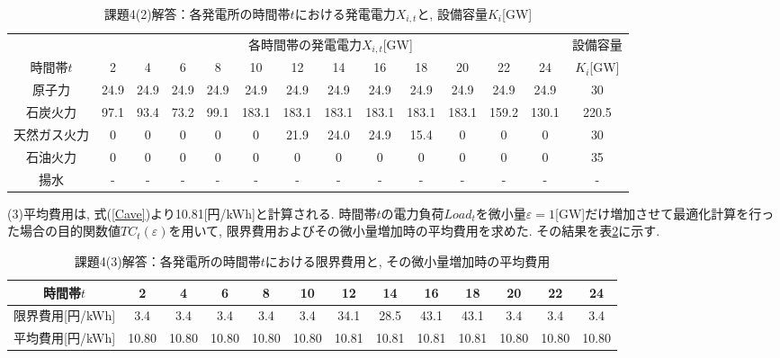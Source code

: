 \documentclass[]{jsarticle}
\begin{document}
          \begin{table}[htb]
            \begin{center}
              \caption{課題4(2)解答：各発電所の時間帯$t$における発電電力$X_{i,t}$と, 設備容量$K_i$[GW]}
              \begin{tabular}{|c||c|c|c|c|c|c|c|c|c|c|c|c||c|} \hline
                \multicolumn{1}{|c||}{} & \multicolumn{12}{|c||}{各時間帯の発電電力$X_{i,t}$[GW]} & \multicolumn{1}{|c|}{設備容量} \\ \cline{1-13}
                時間帯$t$ & 2 & 4 & 6 & 8 & 10 & 12 & 14 & 16 & 18 & 20 & 22 & 24 & $K_i$[GW]\\ \hline \hline
                原子力 &  24.9 & 24.9 & 24.9 & 24.9 & 24.9 & 24.9 & 24.9 & 24.9 & 24.9 & 24.9 & 24.9 & 24.9 & 30\\ \hline
                石炭火力 & 97.1 & 93.4 & 73.2 & 99.1 & 183.1 & 183.1 & 183.1 & 183.1 & 183.1 & 183.1 & 159.2 & 130.1 & 220.5\\ \hline
                天然ガス火力 & 0 & 0 & 0 & 0 & 0 & 21.9 & 24.0 & 24.9 & 15.4 & 0 & 0 & 0 & 30\\ \hline
                石油火力 & 0 & 0 & 0 & 0 & 0 & 0 & 0 & 0 & 0 & 0 & 0 & 0 & 35\\ \hline
                揚水 & - & - & - & - & - & - & - & - & - & - & - & - & - \\ \hline
              \end{tabular}
              \label{ans42}
            \end{center}
          \end{table}


      (3)平均費用は, 式(\ref{Cave})より10.81[円/kWh]と計算される. 時間帯$t$の電力負荷$Load_t$を微小量$\varepsilon = 1$[GW]だけ増加させて最適化計算を行った場合の目的関数値$TC_t(\varepsilon)$を用いて, 限界費用およびその微小量増加時の平均費用を求めた. その結果を表\ref{ans43}に示す.

      \begin{table}
        \begin{center}
          \caption{課題4(3)解答：各発電所の時間帯$t$における限界費用と, その微小量増加時の平均費用}
          \begin{tabular}{|c||c|c|c|c|c|c|c|c|c|c|c|c|} \hline
            時間帯$t$ & 2 & 4 & 6 & 8 & 10 & 12 & 14 & 16 & 18 & 20 & 22 & 24 \\ \hline \hline
            限界費用[円/kWh] & 3.4 & 3.4 & 3.4 & 3.4 & 3.4 & 34.1 & 28.5 & 43.1 & 43.1 & 3.4 & 3.4 & 3.4  \\ \hline
            平均費用[円/kWh] & 10.80 & 10.80 & 10.80 & 10.80 & 10.80 & 10.81 & 10.81 & 10.81 & 10.81 & 10.80 & 10.80 & 10.80    \\ \hline
          \end{tabular}
          \label{ans43}
        \end{center}
      \end{table}
\end{document}

